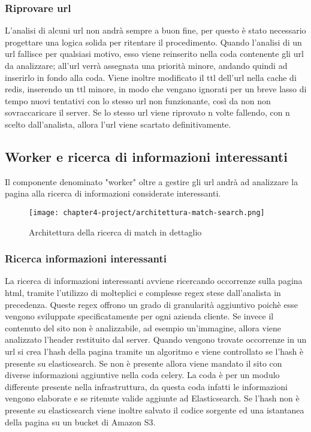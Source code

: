 \subsubsection{Riprovare url}

L'analisi di alcuni url non andrà sempre a buon fine, per questo è stato necessario progettare una logica solida per ritentare il procedimento. Quando l'analisi di un url fallisce per qualsiasi motivo, esso viene reinserito nella coda contenente gli url da analizzare; all'url verrà assegnata una priorità minore, andando quindi ad inserirlo in fondo alla coda. Viene inoltre modificato il \gls{ttl} dell'url nella cache di redis, inserendo un ttl minore, in modo che vengano ignorati per un breve lasso di tempo nuovi tentativi con lo stesso url non funzionante, così da non non sovraccaricare il server. Se lo stesso url viene riprovato n volte fallendo, con n scelto dall'analista, allora l'url viene scartato definitivamente.


\subsection{Worker e ricerca di informazioni interessanti}

Il componente denominato "worker" oltre a gestire gli url andrà ad analizzare la pagina alla ricerca di informazioni considerate interessanti.
\begin{figure}[!h] 
    \centering 
    \texttt{[image: chapter4-project/architettura-match-search.png]} 
    \caption{Architettura della ricerca di match in dettaglio}
\end{figure}

\subsubsection{Ricerca informazioni interessanti}

La ricerca di informazioni interessanti avviene ricercando occorrenze sulla pagina html, tramite l'utilizzo di molteplici e complesse regex stese dall'analista in precedenza. Queste regex offrono un grado di granularità aggiuntivo poichè esse vengono sviluppate specificatamente per ogni azienda cliente. Se invece il contenuto del sito non è analizzabile, ad esempio un'immagine, allora viene analizzato l'header restituito dal server. Quando vengono trovate occorrenze in un url si crea l'hash della pagina tramite un algoritmo e viene controllato se l'hash è presente su elasticsearch. Se non è presente allora viene mandato il sito con diverse informazioni aggiuntive nella coda celery. La coda è per un modulo differente presente nella infrastruttura, da questa coda infatti le informazioni vengono elaborate e se ritenute valide aggiunte ad Elasticsearch. \newline{}
Se l'hash non è presente su elasticsearch viene inoltre salvato il codice sorgente ed una istantanea della pagina su un bucket di Amazon S3.
